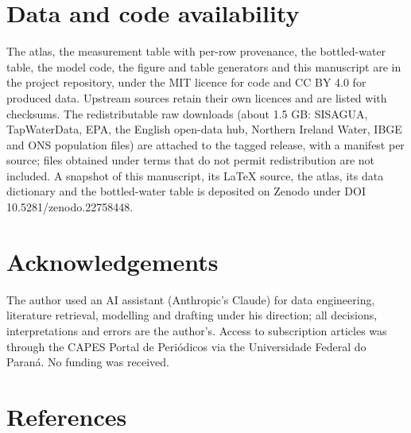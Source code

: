 \documentclass[
  a4paper,
]{article}
\begin{document}
\section{Data and code availability}\label{data-and-code-availability}

The atlas, the measurement table with per-row provenance, the
bottled-water table, the model code, the figure and table generators and
this manuscript are in the project repository, under the MIT licence for
code and CC BY 4.0 for produced data. Upstream sources retain their own
licences and are listed with checksums. The redistributable raw
downloads (about 1.5 GB: SISAGUA, TapWaterData, EPA, the English
open-data hub, Northern Ireland Water, IBGE and ONS population files)
are attached to the tagged release, with a manifest per source; files
obtained under terms that do not permit redistribution are not included.
A snapshot of this manuscript, its LaTeX source, the atlas, its data
dictionary and the bottled-water table is deposited on Zenodo under DOI
10.5281/zenodo.22758448.

\section{Acknowledgements}\label{acknowledgements}

The author used an AI assistant (Anthropic's Claude) for data
engineering, literature retrieval, modelling and drafting under his
direction; all decisions, interpretations and errors are the author's.
Access to subscription articles was through the CAPES Portal de
Periódicos via the Universidade Federal do Paraná. No funding was
received.

\section*{References}\label{references}
\end{document}
